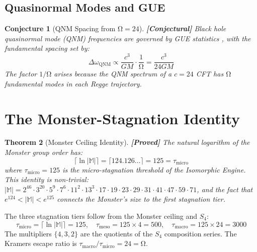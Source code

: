 \documentclass[12pt,a4paper]{article}
\newcommand{\proved}[1]{\textcolor{proved}{\textbf{[Proved]}} #1}
\newcommand{\conjectural}[1]{\textcolor{conjectural}{\textbf{[Conjectural]}} #1}
\newtheorem{theorem}{Theorem}[section]\newtheorem{proposition}[theorem]{Proposition}
\newtheorem{conjecture}[theorem]{Conjecture}
\theoremstyle{definition}\newtheorem{definition}[theorem]{Definition}
\theoremstyle{remark}\newtheorem{remark}[theorem]{Remark}
\renewcommand{\O}{\mathrm{\Omega}}
\newcommand{\Monster}{\mathbb{M}}\newcommand{\Leech}{\Lambda_{24}}
\begin{document}
\subsection{Quasinormal Modes and GUE}

\begin{conjecture}[QNM Spacing from $\O = 24$]
\label{conj:qnm}
\conjectural{Black hole quasinormal mode (QNM) frequencies are governed by GUE
statistics \cite{cotler2017}, with the fundamental spacing set by:}
\begin{equation}
  \Delta\omega_{\mathrm{QNM}} \propto \frac{c^3}{G M} \cdot \frac{1}{\O}
  = \frac{c^3}{24 G M}
\end{equation}
The factor $1/\O$ arises because the QNM spectrum of a $c = 24$ CFT has $\O$
fundamental modes in each Regge trajectory.
\end{conjecture}

\section{The Monster-Stagnation Identity}
\label{sec:monster}

\begin{theorem}[Monster Ceiling Identity]
\label{thm:monster_ceiling}
\proved{The natural logarithm of the Monster group order has:}
\begin{equation}
  \lceil \ln|\Monster| \rceil = \lceil 124.126\ldots \rceil = 125 = \tau_{\mathrm{micro}}
\end{equation}
where $\tau_{\mathrm{micro}} = 125$ is the micro-stagnation threshold of the
Isomorphic Engine. This identity is non-trivial: $|\Monster| = 2^{46} \cdot
3^{20} \cdot 5^9 \cdot 7^6 \cdot 11^2 \cdot 13^3 \cdot 17 \cdot 19 \cdot
23 \cdot 29 \cdot 31 \cdot 41 \cdot 47 \cdot 59 \cdot 71$, and the fact that
$e^{124} < |\Monster| < e^{125}$ connects the Monster's size to the first
stagnation tier.
\end{theorem}

\begin{corollary}
\label{cor:hierarchy}
The three stagnation tiers follow from the Monster ceiling and $S_4$:
\begin{equation}
  \tau_{\mathrm{micro}} = \lceil \ln|\Monster| \rceil = 125, \quad
  \tau_{\mathrm{meso}} = 125 \times 4 = 500, \quad
  \tau_{\mathrm{macro}} = 125 \times 24 = 3000
\end{equation}
The multipliers $\{4, 3, 2\}$ are the quotients of the $S_4$ composition
series. The Kramers escape ratio is $\tau_{\mathrm{macro}}/\tau_{\mathrm{micro}}
= 24 = \O$.
\end{corollary}
\end{document}

